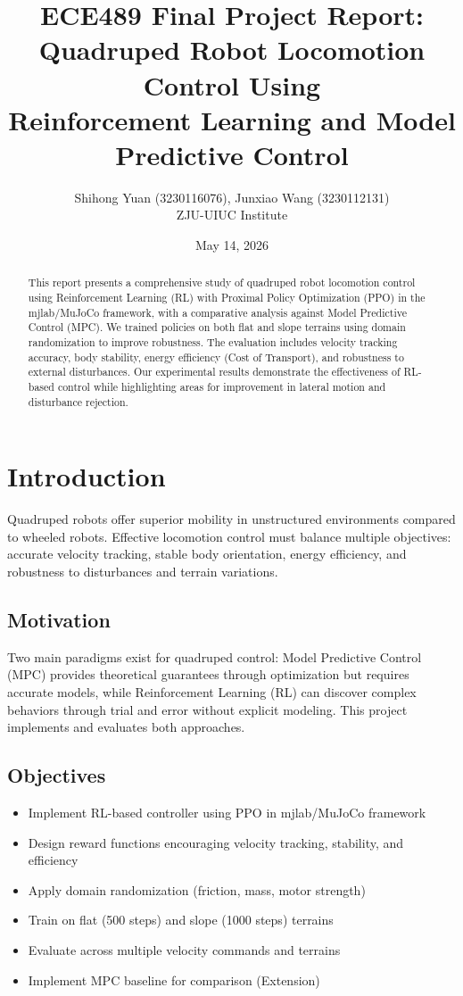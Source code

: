 \documentclass[12pt,a4paper]{article}
\title{\textbf{ECE489 Final Project Report:\\Quadruped Robot Locomotion Control Using\\Reinforcement Learning and Model Predictive Control}}
\author{Shihong Yuan (3230116076), Junxiao Wang (3230112131)\\ZJU-UIUC Institute}
\date{May 14, 2026}
\begin{document}
\maketitle

\begin{abstract}
This report presents a comprehensive study of quadruped robot locomotion control using Reinforcement Learning (RL) with Proximal Policy Optimization (PPO) in the mjlab/MuJoCo framework, with a comparative analysis against Model Predictive Control (MPC). We trained policies on both flat and slope terrains using domain randomization to improve robustness. The evaluation includes velocity tracking accuracy, body stability, energy efficiency (Cost of Transport), and robustness to external disturbances. Our experimental results demonstrate the effectiveness of RL-based control while highlighting areas for improvement in lateral motion and disturbance rejection.
\end{abstract}

\section{Introduction}

Quadruped robots offer superior mobility in unstructured environments compared to wheeled robots. Effective locomotion control must balance multiple objectives: accurate velocity tracking, stable body orientation, energy efficiency, and robustness to disturbances and terrain variations.

\subsection{Motivation}

Two main paradigms exist for quadruped control: Model Predictive Control (MPC) provides theoretical guarantees through optimization but requires accurate models, while Reinforcement Learning (RL) can discover complex behaviors through trial and error without explicit modeling. This project implements and evaluates both approaches.

\subsection{Objectives}

\begin{itemize}
    \item Implement RL-based controller using PPO in mjlab/MuJoCo framework
    \item Design reward functions encouraging velocity tracking, stability, and efficiency
    \item Apply domain randomization (friction, mass, motor strength)
    \item Train on flat (500 steps) and slope (1000 steps) terrains
    \item Evaluate across multiple velocity commands and terrains
    \item Implement MPC baseline for comparison (Extension)
\end{itemize}
\end{document}
